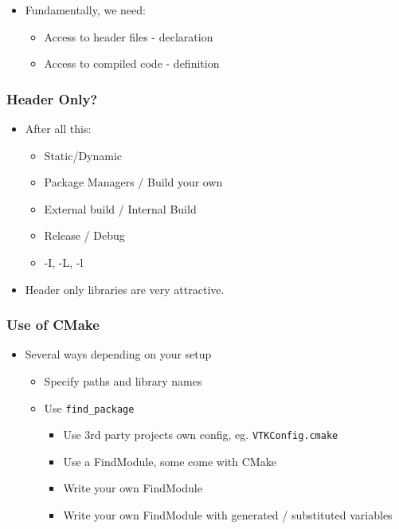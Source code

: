\begin{itemize}
\itemsep1pt\parskip0pt
\item
  Fundamentally, we need:

  \begin{itemize}
  \itemsep1pt\parskip0pt
  \item
    Access to header files - declaration
  \item
    Access to compiled code - definition
  \end{itemize}
\end{itemize}

\subsubsection{Header Only?}\label{header-only}

\begin{itemize}
\itemsep1pt\parskip0pt
\item
  After all this:

  \begin{itemize}
  \itemsep1pt\parskip0pt
  \item
    Static/Dynamic
  \item
    Package Managers / Build your own
  \item
    External build / Internal Build
  \item
    Release / Debug
  \item
    -I, -L, -l
  \end{itemize}
\item
  Header only libraries are very attractive.
\end{itemize}

\subsubsection{Use of CMake}\label{use-of-cmake}

\begin{itemize}
\itemsep1pt\parskip0pt
\item
  Several ways depending on your setup

  \begin{itemize}
  \itemsep1pt\parskip0pt
  \item
    Specify paths and library names
  \item
    Use \texttt{find\_package}

    \begin{itemize}
    \itemsep1pt\parskip0pt
    \item
      Use 3rd party projects own config, eg. \texttt{VTKConfig.cmake}
    \item
      Use a FindModule, some come with CMake
    \item
      Write your own FindModule
    \item
      Write your own FindModule with generated / substituted variables
    \end{itemize}
  \end{itemize}
\end{itemize}

